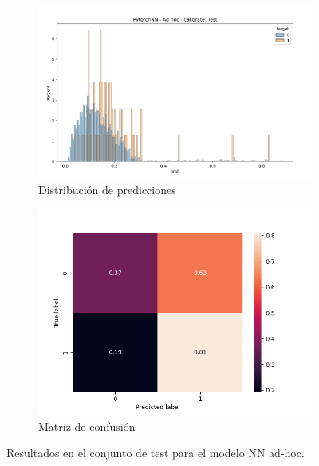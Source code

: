 \begin{figure}[b!]
    \begin{subfigure}[b]{\textwidth}
        \centering
        \includegraphics[width=0.7\linewidth]{figures/results/ad-hoc/nn/calibrate/nn_adhoc_calibrate_test.png}
        \caption{Distribución de predicciones}
        \label{fig:calibrate-bestmoodel-adhoc-test}
    \end{subfigure}
    \begin{subfigure}[b]{\textwidth}
        \centering
        \includegraphics[width=0.7\linewidth]{figures/results/ad-hoc/nn/calibrate/NN_cm_test.png}
        \caption{Matriz de confusión}
        \label{fig:calibrate-bestmoodel-adhoc-test}
    \end{subfigure}
    \caption{Resultados en el conjunto de test para el modelo NN ad-hoc.}
\end{figure}

